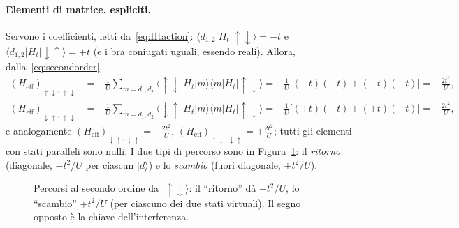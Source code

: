 \documentclass[11pt,a4paper]{article}
\newcommand{\ket}[1]{\lvert #1 \rangle}
\newcommand{\melem}[3]{\langle #1 \vert #2 \vert #3 \rangle}
\newcommand{\up}{\uparrow}
\newcommand{\dn}{\downarrow}
\newcommand{\Heff}{H_{\mathrm{eff}}}
\theoremstyle{definition}
\theoremstyle{remark}
\begin{document}
\paragraph{Elementi di matrice, espliciti.} Servono i coefficienti, letti da~\eqref{eq:Htaction}:
$\melem{d_{1,2}}{H_t}{\up\dn}=-t$ e $\melem{d_{1,2}}{H_t}{\dn\up}=+t$ (e i bra coniugati uguali, essendo
reali). Allora, dalla~\eqref{eq:secondorder},
\begin{align}
(\Heff)_{\up\dn,\,\up\dn}
&=-\frac1U\sum_{m=d_1,d_2}\melem{\up\dn}{H_t}{m}\melem{m}{H_t}{\up\dn}
=-\frac1U\big[(-t)(-t)+(-t)(-t)\big]=-\frac{2t^2}{U},\\
(\Heff)_{\dn\up,\,\up\dn}
&=-\frac1U\sum_{m=d_1,d_2}\melem{\dn\up}{H_t}{m}\melem{m}{H_t}{\up\dn}
=-\frac1U\big[(+t)(-t)+(+t)(-t)\big]=+\frac{2t^2}{U},
\end{align}
e analogamente $(\Heff)_{\dn\up,\dn\up}=-\tfrac{2t^2}{U}$, $(\Heff)_{\up\dn,\dn\up}=+\tfrac{2t^2}{U}$; tutti
gli elementi con stati paralleli sono nulli. I due tipi di percorso sono in Figura~\ref{fig:twohop}: il
\emph{ritorno} (diagonale, $-t^2/U$ per ciascun $\ket{d}$) e lo \emph{scambio} (fuori diagonale, $+t^2/U$).

\begin{figure}[htbp]
\centering
{}
\caption{Percorsi al secondo ordine da $\ket{\up\dn}$: il ``ritorno'' dà $-t^2/U$, lo ``scambio''
$+t^2/U$ (per ciascuno dei due stati virtuali). Il segno opposto è la chiave dell'interferenza.}
\label{fig:twohop}
\end{figure}
\end{document}
